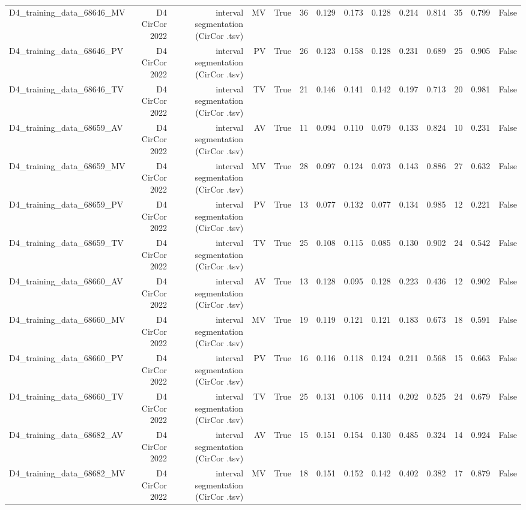 \begin{table}[htbp]
\begin{tabular}{lrrrrrrrrrrrrr}
    D4\_training\_data\_68646\_MV & D4 CirCor 2022 & interval segmentation (CirCor .tsv) & MV & True & 36 & 0.129 & 0.173 & 0.128 & 0.214 & 0.814 & 35 & 0.799 & False \\
    D4\_training\_data\_68646\_PV & D4 CirCor 2022 & interval segmentation (CirCor .tsv) & PV & True & 26 & 0.123 & 0.158 & 0.128 & 0.231 & 0.689 & 25 & 0.905 & False \\
    D4\_training\_data\_68646\_TV & D4 CirCor 2022 & interval segmentation (CirCor .tsv) & TV & True & 21 & 0.146 & 0.141 & 0.142 & 0.197 & 0.713 & 20 & 0.981 & False \\
    D4\_training\_data\_68659\_AV & D4 CirCor 2022 & interval segmentation (CirCor .tsv) & AV & True & 11 & 0.094 & 0.110 & 0.079 & 0.133 & 0.824 & 10 & 0.231 & False \\
    D4\_training\_data\_68659\_MV & D4 CirCor 2022 & interval segmentation (CirCor .tsv) & MV & True & 28 & 0.097 & 0.124 & 0.073 & 0.143 & 0.886 & 27 & 0.632 & False \\
    D4\_training\_data\_68659\_PV & D4 CirCor 2022 & interval segmentation (CirCor .tsv) & PV & True & 13 & 0.077 & 0.132 & 0.077 & 0.134 & 0.985 & 12 & 0.221 & False \\
    D4\_training\_data\_68659\_TV & D4 CirCor 2022 & interval segmentation (CirCor .tsv) & TV & True & 25 & 0.108 & 0.115 & 0.085 & 0.130 & 0.902 & 24 & 0.542 & False \\
    D4\_training\_data\_68660\_AV & D4 CirCor 2022 & interval segmentation (CirCor .tsv) & AV & True & 13 & 0.128 & 0.095 & 0.128 & 0.223 & 0.436 & 12 & 0.902 & False \\
    D4\_training\_data\_68660\_MV & D4 CirCor 2022 & interval segmentation (CirCor .tsv) & MV & True & 19 & 0.119 & 0.121 & 0.121 & 0.183 & 0.673 & 18 & 0.591 & False \\
    D4\_training\_data\_68660\_PV & D4 CirCor 2022 & interval segmentation (CirCor .tsv) & PV & True & 16 & 0.116 & 0.118 & 0.124 & 0.211 & 0.568 & 15 & 0.663 & False \\
    D4\_training\_data\_68660\_TV & D4 CirCor 2022 & interval segmentation (CirCor .tsv) & TV & True & 25 & 0.131 & 0.106 & 0.114 & 0.202 & 0.525 & 24 & 0.679 & False \\
    D4\_training\_data\_68682\_AV & D4 CirCor 2022 & interval segmentation (CirCor .tsv) & AV & True & 15 & 0.151 & 0.154 & 0.130 & 0.485 & 0.324 & 14 & 0.924 & False \\
    D4\_training\_data\_68682\_MV & D4 CirCor 2022 & interval segmentation (CirCor .tsv) & MV & True & 18 & 0.151 & 0.152 & 0.142 & 0.402 & 0.382 & 17 & 0.879 & False \\

\end{tabular}
\end{table}
